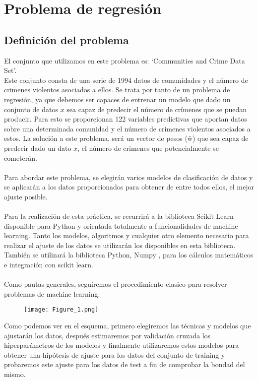 \chapter{Problema de regresión}
\section{Definición del problema}
El conjunto que utilizamos en este problema es: `Communities and Crime Data Set'. \cite{Communities}\\
Este conjunto consta de una serie de 1994 datos de comunidades y el número de crimenes violentos asociados a ellos. Se trata por tanto de un problema de regresión, ya que debemos ser capaces de entrenar un modelo que dado un conjunto de datos $x$ sea capaz de predecir el número de crímenes que se puedan producir. Para esto se proporcionan 122 variables predictivas que aportan datos sobre una determinada comunidad y el número de crimenes violentos asociados a estos. La solución a este problema, será un vector de pesos (ŵ) que sea capaz de predecir dado un dato $x$, el número de crimenes que potencialmente se cometerán.
\\\\
Para abordar este problema, se elegirán varios modelos de clasificación de datos y se aplicarán a los datos proporcionados para obtener de entre todos ellos, el mejor ajuste posible.\\
\\
Para la realización de esta práctica, se recurrirá a la biblioteca Scikit Learn \cite{SkUG} \cite{SkAPI} disponible para Python y orientada totalmente a funcionalidades de machine learning. Tanto los modelos, algoritmos y cualquier otro elemento necesario para realizar el ajuste de los datos se utilizarán los disponibles en esta biblioteca. También se utilizará la biblioteca Python, Numpy \cite{Numpy}, para los cálculos matemáticos e integración con scikit learn.\\
\\
Como pautas generales, seguiremos el procedimiento clasico para resolver problemas de machine learning:

\begin{figure}[h]
   \centering
   \texttt{[image: Figure\_1.png]}
\end{figure}

Como podemos ver en el esquema, primero elegiremos las técnicas y modelos que ajustarán los datos, después estimaremos por validación cruzada los hiperparámetros de los modelos y finalmente utilizaremos estos modelos para obtener una hipótesis de ajuste para los datos del conjunto de training y probaremos este ajuste para los datos de test a fin de comprobar la bondad del mismo.

